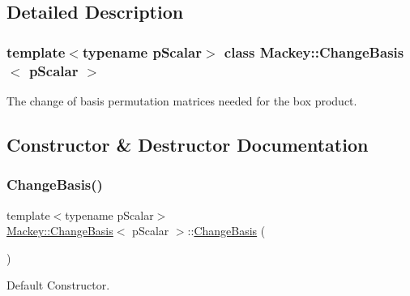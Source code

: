 \subsection{Detailed Description}
\subsubsection*{template$<$typename p\+Scalar$>$\newline
class Mackey\+::\+Change\+Basis$<$ p\+Scalar $>$}

The change of basis permutation matrices needed for the box product. 

\subsection{Constructor \& Destructor Documentation}
\mbox{\label{classMackey_1_1ChangeBasis_a1200b696d4b6db9ad942ee583c320a50}} 
\subsubsection{\texorpdfstring{Change\+Basis()}{ChangeBasis()}\hspace{0.1cm}{\footnotesize\ttfamily [1/2]}}
{\footnotesize\ttfamily template$<$typename p\+Scalar$>$ \\
\hyperlink{classMackey_1_1ChangeBasis}{Mackey\+::\+Change\+Basis}$<$ p\+Scalar $>$\+::\hyperlink{classMackey_1_1ChangeBasis}{Change\+Basis} (\begin{DoxyParamCaption}{ }\end{DoxyParamCaption})\hspace{0.3cm}{\ttfamily [inline]}}



Default Constructor. 

\mbox{\label{classMackey_1_1ChangeBasis_a8cc49fe5537e7038ff7d142ba76e7c7b}} 
